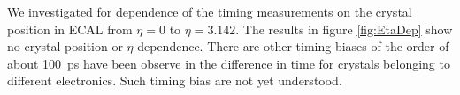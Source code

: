 We investigated for dependence of the timing measurements on the crystal position in ECAL from $\eta = 0$ to $\eta = 3.142$. The results in figure \ref{fig:EtaDep} show no crystal position or $\eta$ dependence.
There are other timing biases of the order of about 100~ps have been observe in the difference in time for crystals belonging to different electronics. Such timing bias are not yet understood.

